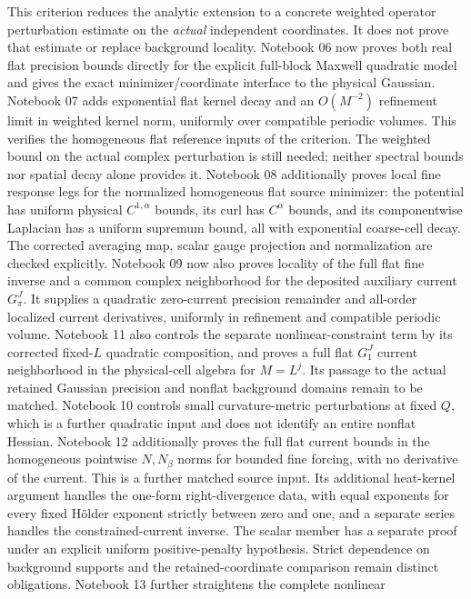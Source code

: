 \documentclass[11pt]{article}
\theoremstyle{remark}
\begin{document}
This criterion reduces the analytic extension to a concrete weighted
operator perturbation estimate on the \emph{actual} independent
coordinates. It does not prove that estimate or replace background
locality.
Notebook 06 now proves both real flat precision bounds directly for
the explicit full-block Maxwell quadratic model and gives the exact
minimizer/coordinate interface to the physical Gaussian. Notebook 07
adds exponential flat kernel decay and an $O(M^{-2})$ refinement limit
in weighted kernel norm, uniformly over compatible periodic volumes.
This verifies the homogeneous flat reference inputs of the criterion.
The weighted bound on the actual complex perturbation is still needed;
neither spectral bounds nor spatial decay alone provides it.
Notebook 08 additionally proves local fine response legs for the
normalized homogeneous flat source minimizer: the potential has
uniform physical $C^{1,\alpha}$ bounds, its curl has $C^\alpha$
bounds, and its componentwise Laplacian has a uniform supremum
bound, all with exponential coarse-cell decay. The corrected
averaging map, scalar gauge projection and normalization are
checked explicitly. Notebook 09 now also proves locality of the full
flat fine inverse and a common complex neighborhood for the deposited
auxiliary current $G_\pi^J$. It supplies a quadratic zero-current
precision remainder and all-order localized current derivatives,
uniformly in refinement and compatible periodic volume. Notebook 11
also controls the separate nonlinear-constraint term by its corrected
fixed-$L$ quadratic composition, and proves a full flat $G_1^J$
current neighborhood in the physical-cell algebra for $M=L^j$.
Its passage to the actual retained Gaussian precision and nonflat
background domains remain to be matched. Notebook 10 controls small curvature-metric
perturbations at fixed $Q$, which is a further quadratic input and
does not identify an entire nonflat Hessian.
Notebook 12 additionally proves the full flat current bounds in
the homogeneous pointwise $N,N_\beta$ norms for bounded fine
forcing, with no derivative of the current. This is a further
matched source input. Its additional heat-kernel argument handles
the one-form right-divergence data, with equal exponents for every
fixed H\"older exponent strictly between zero and one,
and a separate series handles the constrained-current inverse.
The scalar member has a separate proof under an explicit uniform
positive-penalty hypothesis. Strict dependence on background
supports and the retained-coordinate comparison remain distinct
obligations. Notebook 13 further straightens the complete nonlinear
\end{document}
